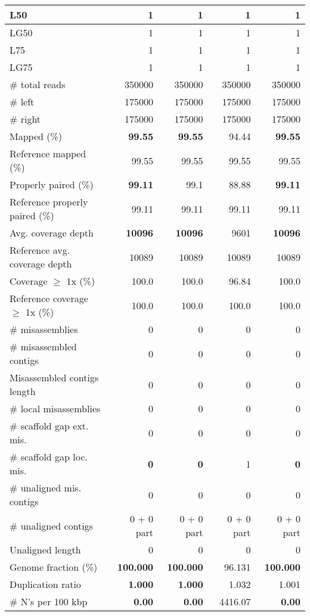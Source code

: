 \documentclass[12pt,a4paper]{article}
\begin{document}
\begin{table}[ht]
\begin{center}
\begin{tabular}{|l*{4}{|r}|}
L50 & 1 & 1 & 1 & 1 \\ \hline
LG50 & 1 & 1 & 1 & 1 \\ \hline
L75 & 1 & 1 & 1 & 1 \\ \hline
LG75 & 1 & 1 & 1 & 1 \\ \hline
\# total reads & 350000 & 350000 & 350000 & 350000 \\ \hline
\# left & 175000 & 175000 & 175000 & 175000 \\ \hline
\# right & 175000 & 175000 & 175000 & 175000 \\ \hline
Mapped (\%) & {\bf 99.55} & {\bf 99.55} & 94.44 & {\bf 99.55} \\ \hline
Reference mapped (\%) & 99.55 & 99.55 & 99.55 & 99.55 \\ \hline
Properly paired (\%) & {\bf 99.11} & 99.1 & 88.88 & {\bf 99.11} \\ \hline
Reference properly paired (\%) & 99.11 & 99.11 & 99.11 & 99.11 \\ \hline
Avg. coverage depth & {\bf 10096} & {\bf 10096} & 9601 & {\bf 10096} \\ \hline
Reference avg. coverage depth & 10089 & 10089 & 10089 & 10089 \\ \hline
Coverage $\geq$ 1x (\%) & 100.0 & 100.0 & 96.84 & 100.0 \\ \hline
Reference coverage $\geq$ 1x (\%) & 100.0 & 100.0 & 100.0 & 100.0 \\ \hline
\# misassemblies & 0 & 0 & 0 & 0 \\ \hline
\# misassembled contigs & 0 & 0 & 0 & 0 \\ \hline
Misassembled contigs length & 0 & 0 & 0 & 0 \\ \hline
\# local misassemblies & 0 & 0 & 0 & 0 \\ \hline
\# scaffold gap ext. mis. & 0 & 0 & 0 & 0 \\ \hline
\# scaffold gap loc. mis. & {\bf 0} & {\bf 0} & 1 & {\bf 0} \\ \hline
\# unaligned mis. contigs & 0 & 0 & 0 & 0 \\ \hline
\# unaligned contigs & 0 + 0 part & 0 + 0 part & 0 + 0 part & 0 + 0 part \\ \hline
Unaligned length & 0 & 0 & 0 & 0 \\ \hline
Genome fraction (\%) & {\bf 100.000} & {\bf 100.000} & 96.131 & {\bf 100.000} \\ \hline
Duplication ratio & {\bf 1.000} & {\bf 1.000} & 1.032 & 1.001 \\ \hline
\# N's per 100 kbp & {\bf 0.00} & {\bf 0.00} & 4416.07 & {\bf 0.00} \\ \hline

\end{tabular}
\end{center}
\end{table}
\end{document}
